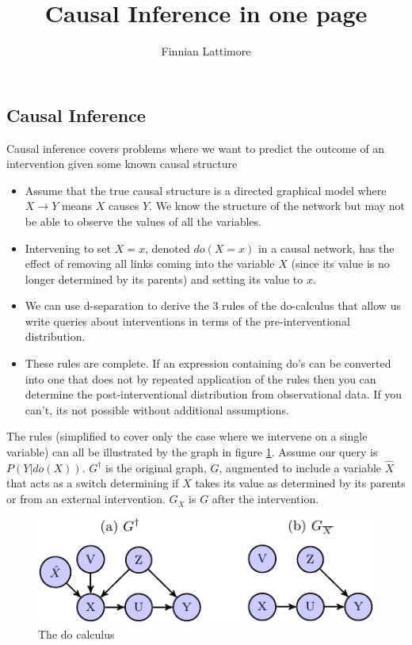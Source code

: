 \documentclass{article}
\author{Finnian Lattimore}
\title{Causal Inference in one page}
\begin{document}
\def\ci{\perp\!\!\!\perp}
\setlength\parindent{0pt}
\subsection*{Causal Inference}
Causal inference covers problems where we want to predict the outcome of an intervention given some known causal structure
\begin{itemize}
\item Assume that the true causal structure is a directed graphical model where $X \rightarrow Y$ means $X$ causes $Y$. We know the structure of the network but may not be able to observe the values of all the variables.
\item Intervening to set $X = x$, denoted $do(X=x)$ in a causal network, has the effect of removing all links coming into the variable $X$ (since its value is no longer determined by its parents) and setting its value to $x$.
\item We can use d-separation to derive the 3 rules of the do-calculus that allow us write queries about interventions in terms of the pre-interventional distribution. 
\item These rules are complete.  If an expression containing do's can be converted into one that does not by repeated application of the rules then you can determine the post-interventional distribution from observational data. If you can't, its not possible without additional assumptions.
\end{itemize}
The rules (simplified to cover only the case where we intervene on a single variable) can all be illustrated by the graph in figure \ref{fig:dorules}. Assume our query is $P(Y|do(X))$. $G^{\dagger}$ is the original graph, $G$, augmented to include a variable $\hat{X}$  that acts as a switch determining if $X$ takes its value as determined by its parents or from an external intervention. $G_{\overline{X}}$ is $G$ after the intervention. 

\begin{figure}[h]
\caption{The do calculus}
\label{fig:dorules}
\centering
\includegraphics[scale=0.9]{do_rules_figure-crop}
\end{figure}
\end{document}
